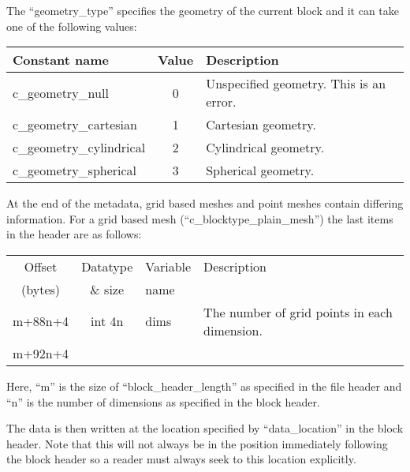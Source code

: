 \documentclass[12pt]{article}
\begin{document}
The ``geometry\_type'' specifies the geometry of the current block and it can
take one of the following values:\\

\begin{center}
\begin{tabularx}{0.9\textwidth}[!hbt]{lcX}
  Constant name & Value & Description
  \\\toprule

  c\_geometry\_null & 0 & Unspecified geometry. This is an error.
  \\\midrule

  c\_geometry\_cartesian & 1 & Cartesian geometry.
  \\\midrule

  c\_geometry\_cylindrical & 2 & Cylindrical geometry.
  \\\midrule

  c\_geometry\_spherical & 3 & Spherical geometry.
\end{tabularx}
\end{center}\vspace{10pt}

At the end of the metadata, grid based meshes and point meshes contain
differing information. For a grid based mesh (``c\_blocktype\_plain\_mesh'')
the last items in the header are as follows:\\

\begin{center}
\begin{tabularx}{0.9\textwidth}[!hbt]{cclX}
  Offset & Datatype & Variable & Description\\
  (bytes) & \& size & name &
  \\\toprule

  m+88n+4 & int 4n & dims & The number of grid points in each dimension.
  \\\midrule

  m+92n+4 &
\end{tabularx}
\end{center}\vspace{10pt}

Here, ``m'' is the size of ``block\_header\_length'' as specified in the file
header and ``n'' is the number of dimensions as specified in the block header.

The data is then written at the location specified by ``data\_location'' in
the block header. Note that this will not always be in the position immediately
following the block header so a reader must always seek to this location
explicitly.
\end{document}
